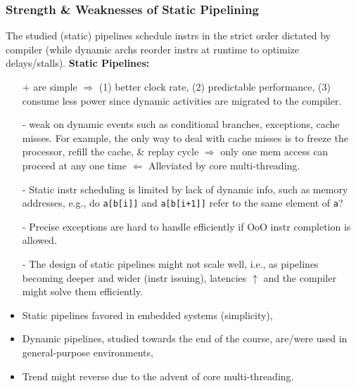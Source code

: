 \documentclass{beamer}
\renewcommand{\emph}[1]{\textcolor{structure}{#1}}
\newcommand{\emp}[1]{\textcolor{DikuRed}{ #1}}
\begin{document}
\begin{frame}[fragile,t]
\frametitle{Strength \& Weaknesses of Static Pipelining}


\begin{scriptsize}
The studied (static) pipelines schedule instrs in the strict order 
dictated by compiler (while dynamic archs reorder instrs at runtime 
to optimize delays/stalls). {\bf Static Pipelines:} 
\begin{itemize}
\item[+] are \emph{simple} $\Rightarrow$ (1) better clock rate,
            (2) predictable performance, (3) consume less power since
                dynamic activities are migrated to the compiler.
\item[-] \emp{weak on dynamic events} such as conditional branches,
            exceptions, cache misses. 
        For example, the only way to deal with cache misses is to freeze
            the processor, refill the cache, \& replay cycle $\Rightarrow$
            only one mem access can proceed at any one time
            $\Leftarrow$ \emph{Alleviated by core multi-threading.}
\item[-] \emp{Static instr scheduling is limited by lack of dynamic info},
            such as memory addresses, e.g., do {\tt a[b[i]]} and 
            {\tt a[b[i+1]]} refer to the same element of {\tt a}?
\item[-] \emp{Precise exceptions are hard to handle efficiently} if OoO
            instr completion is allowed.
\item[-] \emp{The design of static pipelines might not scale well}, 
            i.e., as pipelines becoming deeper
            and wider (instr issuing), latencies $\uparrow$ and the
            compiler might solve them efficiently.  
\end{itemize}

\bigskip
\end{scriptsize}

\begin{itemize}
\item Static pipelines favored in embedded systems (simplicity),
\item Dynamic pipelines, studied towards the end of the course, are/were used
        in general-purpose environments,
\item \emph{Trend might reverse due to the advent of core multi-threading}.  
\end{itemize}

\end{frame}
\end{document}
